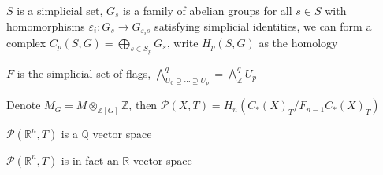 \documentclass[../main.tex]{subfiles}
\begin{document}
\begin{definition}
$S$ is a simplicial set, $G_s$ is a family of abelian groups for all $s\in S$ with homomorphisms $\varepsilon_i:G_s\to G_{\varepsilon_is}$ satisfying simplicial identities, we can form a complex $C_p(S, G)=\displaystyle\bigoplus_{s\in S_p}G_s$, write $H_p(S,G)$ as the homology
\end{definition}

\begin{example}
$F$ is the simplicial set of flags, $\bigwedge^q_{U_0\supseteq\cdots\supseteq U_p}=\bigwedge^q_{\mathbb Z}U_p$
\end{example}

\begin{definition}
Denote $M_G=M\otimes_{\mathbb Z[G]}\mathbb Z$, then $\mathcal{P}(X,T)=H_n(C_*(X)_T/F_{n-1}C_*(X)_T)$
\end{definition}

\begin{theorem}
$\mathcal{P}(\mathbb R^n,T)$ is a $\mathbb Q$ vector space
\end{theorem}

\begin{remark}
$\mathcal{P}(\mathbb R^n,T)$ is in fact an $\mathbb R$ vector space
\end{remark}
\end{document}
